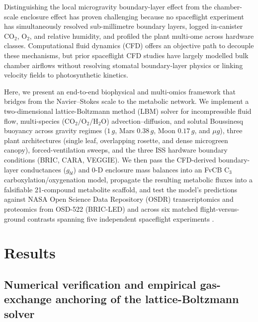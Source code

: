 \documentclass[10pt,twocolumn,a4paper]{article}
\begin{document}
Distinguishing the local microgravity boundary-layer effect from the chamber-scale enclosure effect has proven challenging because no spaceflight experiment has simultaneously resolved sub-millimetre boundary layers, logged in-canister $\mathrm{CO_2}$, $\mathrm{O_2}$, and relative humidity, and profiled the plant multi-ome across hardware classes. Computational fluid dynamics (CFD) offers an objective path to decouple these mechanisms, but prior spaceflight CFD studies have largely modelled bulk chamber airflows without resolving stomatal boundary-layer physics or linking velocity fields to photosynthetic kinetics.

Here, we present an end-to-end biophysical and multi-omics framework that bridges from the Navier--Stokes scale to the metabolic network. We implement a two-dimensional lattice-Boltzmann method (LBM) solver for incompressible fluid flow, multi-species ($\mathrm{CO_2/O_2/H_2O}$) advection--diffusion, and solutal Boussinesq buoyancy across gravity regimes ($1\,g$, Mars $0.38\,g$, Moon $0.17\,g$, and $\mu g$), three plant architectures (single leaf, overlapping rosette, and dense microgreen canopy), forced-ventilation sweeps, and the three ISS hardware boundary conditions (BRIC, CARA, VEGGIE). We then pass the CFD-derived boundary-layer conductances ($g_{bl}$) and 0-D enclosure mass balances into an FvCB $\mathrm{C_3}$ carboxylation/oxygenation model, propagate the resulting metabolic fluxes into a falsifiable 21-compound metabolite scaffold, and test the model's predictions against NASA Open Science Data Repository (OSDR) transcriptomics and proteomics from OSD-522 (BRIC-LED) \citep{osd522} and across six matched flight-versus-ground contrasts spanning five independent spaceflight experiments \citep{osd522,osd38,osd321,osd678,osd427}.

\section*{Results}\label{sec:results}

\subsection*{Numerical verification and empirical gas-exchange anchoring of the lattice-Boltzmann solver}\label{sec:validation}
\end{document}
